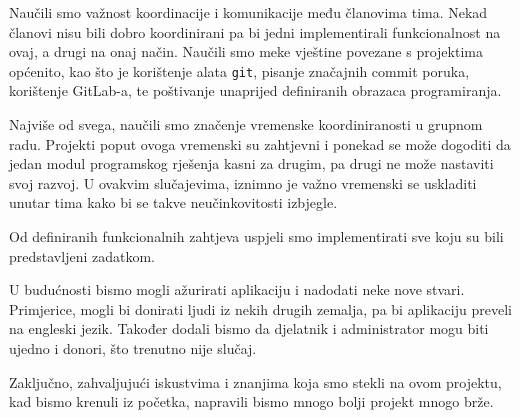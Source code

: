 	Naučili smo važnost koordinacije i komunikacije među članovima tima. Nekad članovi nisu bili dobro koordinirani pa bi jedni implementirali funkcionalnost na ovaj, a drugi na onaj način. Naučili smo meke vještine povezane s projektima općenito, kao što je korištenje alata \texttt{git}, pisanje značajnih commit poruka, korištenje GitLab-a, te poštivanje unaprijed definiranih obrazaca programiranja. 
	
	Najviše od svega, naučili smo značenje vremenske koordiniranosti u grupnom radu. Projekti poput ovoga vremenski su zahtjevni i ponekad se može dogoditi da jedan modul programskog rješenja kasni za drugim, pa drugi ne može nastaviti svoj razvoj. U ovakvim slučajevima, iznimno je važno vremenski se uskladiti unutar tima kako bi se takve neučinkovitosti izbjegle. 
	
	Od definiranih funkcionalnih zahtjeva uspjeli smo implementirati sve koju su bili predstavljeni zadatkom.
	
	U budućnosti bismo mogli ažurirati aplikaciju i nadodati neke nove stvari. Primjerice, mogli bi donirati ljudi iz nekih drugih zemalja, pa bi aplikaciju preveli na engleski jezik. Također dodali bismo da djelatnik i administrator mogu biti ujedno i donori, što trenutno nije slučaj.

	Zaključno, zahvaljujući iskustvima i znanjima koja smo stekli na ovom projektu, kad bismo krenuli iz početka, napravili bismo mnogo bolji projekt mnogo brže.
	\eject 
